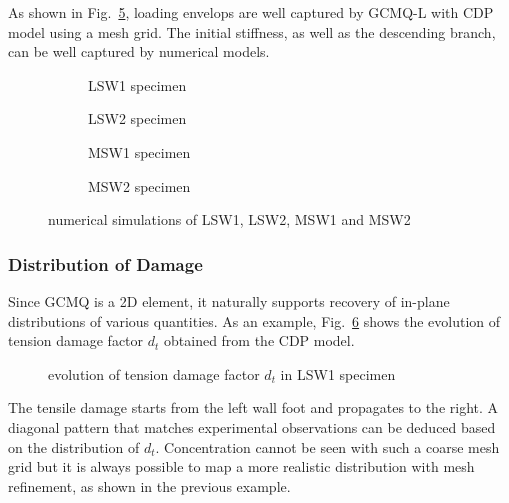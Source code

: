 \documentclass[3p,review,sort&compress,11pt,fleqn]{elsarticle}
\newcommand*{\figref}[1]{Fig.~\ref{#1}}
\begin{document}
As shown in \figref{fig:salonikios_wall}, loading envelops are well captured by GCMQ-L with CDP model using a  mesh grid. The initial stiffness, as well as the descending branch, can be well captured by numerical models.
\begin{figure}[htb]
\scriptsize\centering
\begin{subfigure}[b]{.48\textwidth}

\caption{LSW1 specimen}\label{fig:lsw1_pushover}
\end{subfigure}\quad
\begin{subfigure}[b]{.48\textwidth}

\caption{LSW2 specimen}\label{fig:lsw2_pushover}
\end{subfigure}
\begin{subfigure}[b]{.48\textwidth}

\caption{MSW1 specimen}\label{fig:msw1_pushover}
\end{subfigure}\quad
\begin{subfigure}[b]{.48\textwidth}

\caption{MSW2 specimen}\label{fig:msw2_pushover}
\end{subfigure}
\caption{numerical simulations of LSW1, LSW2, MSW1 and MSW2}\label{fig:salonikios_wall}
\end{figure}
\subsubsection{Distribution of Damage}
Since GCMQ is a 2D element, it naturally supports recovery of in-plane distributions of various quantities. As an example, \figref{fig:tension_damage_lsw1} shows the evolution of tension damage factor $d_t$ obtained from the CDP model.
\begin{figure}[htb]
\scriptsize\centering

\caption{evolution of tension damage factor $d_t$ in LSW1 specimen}\label{fig:tension_damage_lsw1}
\end{figure}
The tensile damage starts from the left wall foot and propagates to the right. A diagonal pattern that matches experimental observations can be deduced based on the distribution of $d_t$. Concentration cannot be seen with such a coarse mesh grid but it is always possible to map a more realistic distribution with mesh refinement, as shown in the previous example.
\end{document}
